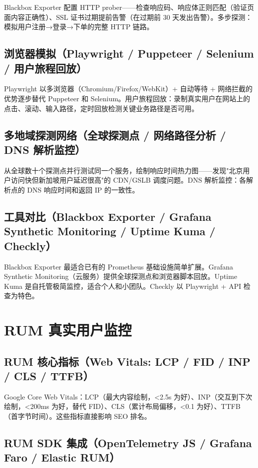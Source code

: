 \documentclass[12pt,UTF8]{ctexbook}
\begin{document}
Blackbox Exporter 配置 HTTP prober——检查响应码、响应体正则匹配（验证页面内容正确性）、SSL 证书过期提前告警（在过期前 30 天发出告警）。多步探测：模拟用户注册→登录→下单的完整 HTTP 链路。

    \subsection{浏览器模拟（Playwright / Puppeteer / Selenium / 用户旅程回放）}

Playwright 以多浏览器（Chromium/Firefox/WebKit）+ 自动等待 + 网络拦截的优势逐步替代 Puppeteer 和 Selenium。用户旅程回放：录制真实用户在网站上的点击、滚动、输入路径，定时回放检测关键业务路径是否可用。

    \subsection{多地域探测网络（全球探测点 / 网络路径分析 / DNS 解析监控）}

从全球数十个探测点并行测试同一个服务，绘制响应时间热力图——发现"北京用户访问快但新加坡用户延迟很高"的 CDN/GSLB 调度问题。DNS 解析监控：各解析点的 DNS 响应时间和返回 IP 的一致性。

    \subsection{工具对比（Blackbox Exporter / Grafana Synthetic Monitoring / Uptime Kuma / Checkly）}

Blackbox Exporter 最适合已有的 Prometheus 基础设施简单扩展。Grafana Synthetic Monitoring（云服务）提供全球探测点和浏览器脚本回放。Uptime Kuma 是自托管极简监控，适合个人和小团队。Checkly 以 Playwright + API 检查为特色。

  \section{RUM 真实用户监控}
    \subsection{RUM 核心指标（Web Vitals: LCP / FID / INP / CLS / TTFB）}

Google Core Web Vitals：LCP（最大内容绘制，<2.5s 为好）、INP（交互到下次绘制，<200ms 为好，替代 FID）、CLS（累计布局偏移，<0.1 为好）、TTFB（首字节时间）。这些指标直接影响 SEO 排名。

    \subsection{RUM SDK 集成（OpenTelemetry JS / Grafana Faro / Elastic RUM）}
\end{document}
